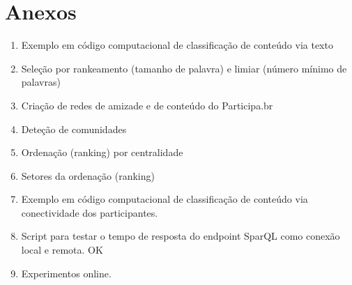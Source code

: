 \section*{Anexos}
\begin{enumerate}
\item Exemplo em código computacional de classificação de conteúdo via texto
\item Seleção por rankeamento (tamanho de palavra) e limiar (número mínimo de palavras)
\item Criação de redes de amizade e de conteúdo do Participa.br
\item Deteção de comunidades
\item Ordenação (ranking) por centralidade
\item Setores da ordenação (ranking)
\item Exemplo em código computacional de classificação de conteúdo via conectividade dos participantes.
\item Script para testar o tempo de resposta do endpoint SparQL como conexão local e remota. OK
\item Experimentos online.
\end{enumerate}
